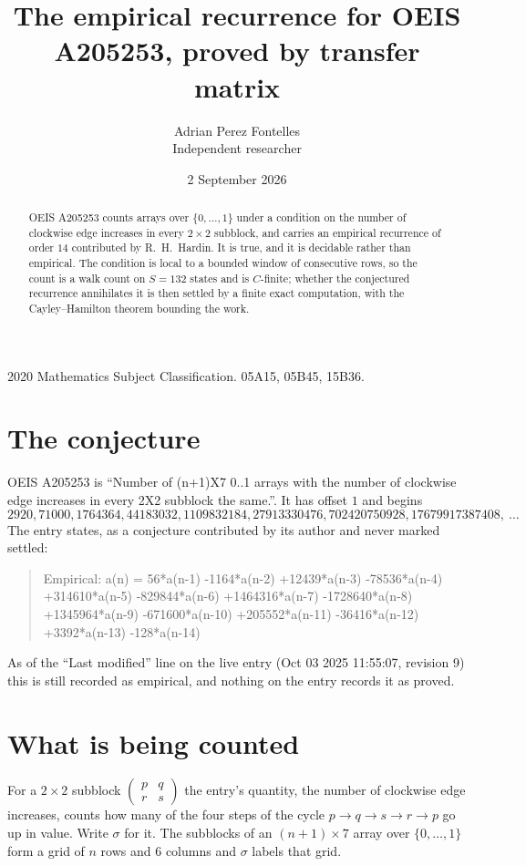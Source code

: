 \documentclass[11pt,a4paper]{article}
\title{The empirical recurrence for OEIS A205253, proved by transfer matrix}
\author{Adrian Perez Fontelles\\ \small Independent researcher}
\date{2 September 2026}
\theoremstyle{plain}
\theoremstyle{definition}
\begin{document}
\maketitle

\begin{abstract}
OEIS A205253 counts arrays over $\{0,\dots,1\}$ under a condition on the number of clockwise edge increases
in every $2\times2$ subblock, and carries an empirical recurrence of order $14$ contributed by
R.~H.~Hardin. It is true, and it is decidable rather than empirical. The condition is local to
a bounded window of consecutive rows, so the count is a walk count on $S=132$ states and is
$C$-finite; whether the conjectured recurrence annihilates it is then settled by a finite exact
computation, with the Cayley--Hamilton theorem bounding the work.
\end{abstract}

\noindent\small 2020 Mathematics Subject Classification. 05A15, 05B45, 15B36.\normalsize

\section{The conjecture}

OEIS A205253 is ``Number of (n+1)X7 0..1 arrays with the number of clockwise edge increases in every 2X2 subblock the same.''. It has offset $1$ and begins
\[
2920, 71000, 1764364, 44183032, 1109832184, 27913330476, 702420750928, 17679917387408,\ \dots
\]
The entry states, as a conjecture contributed by its author and never marked settled:
\begin{quote}
Empirical: a(n) = 56*a(n-1) -1164*a(n-2) +12439*a(n-3) -78536*a(n-4) +314610*a(n-5) -829844*a(n-6) +1464316*a(n-7) -1728640*a(n-8) +1345964*a(n-9) -671600*a(n-10) +205552*a(n-11) -36416*a(n-12) +3392*a(n-13) -128*a(n-14)
\end{quote}
As of the ``Last modified'' line on the live entry (Oct 03 2025 11:55:07, revision 9) this is still
recorded as empirical, and nothing on the entry records it as proved.

\section{What is being counted}

For a $2\times2$ subblock $\begin{pmatrix}p&q\\r&s\end{pmatrix}$ the
entry's quantity, the number of clockwise edge increases, counts how many of the four steps of the cycle $p\to q\to s\to r\to p$ go up in value. Write $\sigma$ for it. The subblocks of an
$(n+1)\times7$ array over $\{0,\dots,1\}$ form a grid of $n$ rows and $6$
columns and $\sigma$ labels that grid.
\end{document}
